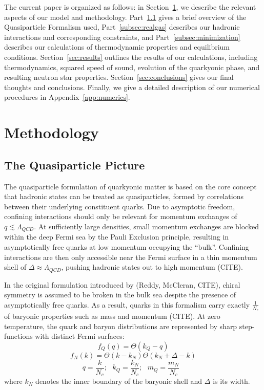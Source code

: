 \documentclass[twocolumn,floatfix,superscriptaddress,a4paper,showkeys,nofootinbib,reprint]{revtex4-1}
\begin{document}
The current paper is organized as follows: in Section~\ref{sec:method}, we describe the relevant aspects of our model and methodology. Part~\ref{subsec:quasi} gives a brief overview of the Quasiparticle Formalism used, Part~\ref{subsec:realgas} describes our hadronic interactions and corresponding constraints, and Part~\ref{subsec:minimization} describes our calculations of thermodynamic properties and equilibrium conditions. Section~\ref{sec:results} outlines the results of our calculations, including thermodynamics, squared speed of sound, evolution of the quarkyonic phase, and resulting neutron star properties. Section~\ref{sec:conclusions} gives our final thoughts and conclusions. Finally, we give a detailed description of our numerical procedures in Appendix~\ref{app:numerics}.


\section{Methodology}
\label{sec:method}

\subsection{The Quasiparticle Picture}
\label{subsec:quasi}


The quasiparticle formulation of quarkyonic matter is based on the
core concept that hadronic states can be treated as quasiparticles, formed by correlations between their underlying constituent quarks. Due to asymptotic freedom, confining interactions should only be relevant for momentum exchanges of $q \lesssim \Lambda_{QCD}$. At sufficiently large densities, small momentum exchanges are blocked within the deep Fermi sea by the Pauli Exclusion principle, resulting in asymptotically free quarks at low momentum occupying the ``bulk''. Confining interactions are then only accessible near the Fermi surface in a thin momentum shell of $\Delta \approx \Lambda_{QCD}$, pushing hadronic states out to high momentum (CITE). 

In the original formulation introduced by (Reddy, McCleran, CITE), chiral symmetry is assumed to be broken in the bulk sea despite the presence of asymptotically free quarks. As a result, quarks in this formalism carry exactly $\frac{1}{N_c}$ of baryonic properties such as mass and momentum (CITE). At zero temperature, the quark and baryon distributions are
represented by sharp step-functions with distinct Fermi surfaces:
\begin{equation}
    f_Q(q) = \Theta(k_Q-q)
\end{equation}
\begin{equation}
    f_N(k)
    =
    \Theta(k-k_N)
    \Theta(k_N+\Delta-k)
\end{equation}
\begin{equation}
    q = \frac{k}{N_c};~~~
    k_Q = \frac{k_N}{N_c};~~~
    m_Q = \frac{m_N}{N_c}~~~
\end{equation}
where $k_N$ denotes the inner boundary of the baryonic shell and
$\Delta$ is its width. 
\end{document}
